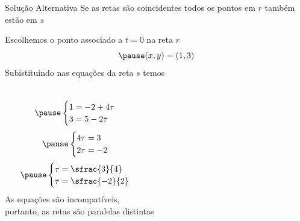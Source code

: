\begin{resolution}{Solução Alternativa}
  Se as retas são coincidentes todos os pontos em $r$ também estão em $s$

  \pause
  Escolhemos o ponto associado a $t=0$ na reta $r$
  \[
    \pause
    (x, y) = (1, 3)
  \]
  \pause
  Subistituindo nas equações da reta $s$ temos
\vspace{-\baselineskip}
\begin{columns}[t]
  \[
    \pause
    \begin{cases}
      1 = -2 + 4\tau \\
      3 =  5 - 2\tau
    \end{cases}
  \]
  \[
    \pause
    \begin{cases}
      4\tau = 3 \\
      2\tau = -2
    \end{cases}
  \]
  \[
    \pause
    \begin{cases}
      \tau = \sfrac{3}{4} \\
      \tau = \sfrac{-2}{2}
    \end{cases}
  \]
  \pause
  As equações são incompatíveis, \\
  \pause
  portanto, as retas são paralelas distintas
\end{columns}
\end{resolution}

\endinput
